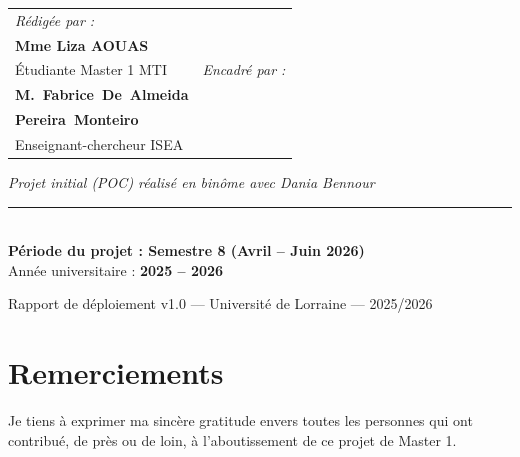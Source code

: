 \documentclass[12pt, a4paper]{report}
\begin{document}
\begin{titlepage}
\vspace{1.8cm}
\begin{center}
\begin{tcolorbox}[
  enhanced, colback=bleuClair!50, colframe=griMoyen!50,
  boxrule=0.8pt, arc=4pt, width=0.78\textwidth,
]
\renewcommand{\arraystretch}{1.6}
\begin{tabular}{@{}p{7cm} p{7cm}@{}}
  \raggedright
  {\large\itshape R\'edig\'ee par :}\\[0.2cm]
  {\large\bfseries Mme Liza AOUAS}\\
  {\small \'Etudiante Master 1 MTI}
  &
  \raggedleft
  {\large\itshape Encadr\'e par :}\\[0.2cm]
  {\large\bfseries \mbox{M. Fabrice De Almeida}}\\
  {\large\bfseries \mbox{Pereira Monteiro}}\\
  {\small Enseignant-chercheur ISEA}
\end{tabular}
\end{tcolorbox}
\end{center}

\vspace{0.8cm}
\begin{center}
  {\small\itshape Projet initial (POC) r\'ealis\'e en bin\^ome avec
    Dania Bennour}\\[0.8cm]
  {\color{griMoyen!60}\rule{9cm}{0.5pt}}\\[0.5cm]
  {\normalsize\bfseries P\'eriode du projet : Semestre 8 (Avril -- Juin 2026)}\\[0.2cm]
  {\normalsize Ann\'ee universitaire : \textbf{2025 -- 2026}}
\end{center}

\vfill
\begin{center}
  {\color{white}\small Rapport de d\'eploiement v1.0 ---
    Universit\'e de Lorraine --- 2025/2026}
\end{center}
\end{titlepage}
\restoregeometry

\chapter*{Remerciements}
\thispagestyle{fancy}

Je tiens \`a exprimer ma sinc\`ere gratitude envers toutes les personnes
qui ont contribu\'e, de pr\`es ou de loin, \`a l'aboutissement de ce
projet de Master 1.
\end{document}
